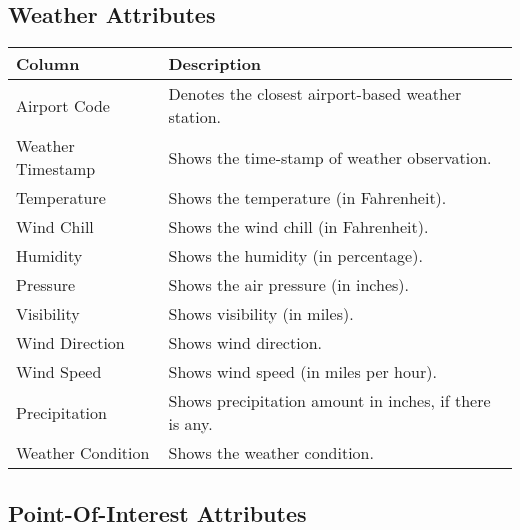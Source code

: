 \subsection{Weather Attributes}
\label{section:weather_attrs}

\begin{longtable}[c]{l | l}
    Column & Description \\
    \hline
    Airport Code & Denotes the closest airport-based weather station. \\
    Weather Timestamp & Shows the time-stamp of weather observation. \\
    Temperature & Shows the temperature (in Fahrenheit). \\
    Wind Chill & Shows the wind chill (in Fahrenheit). \\
    Humidity & Shows the humidity (in percentage). \\
    Pressure & Shows the air pressure (in inches). \\
    Visibility & Shows visibility (in miles). \\
    Wind Direction & Shows wind direction. \\
    Wind Speed & Shows wind speed (in miles per hour). \\
    Precipitation & Shows precipitation amount in inches, if there is any. \\
    Weather Condition & Shows the weather condition. \\
\end{longtable}

\subsection{Point-Of-Interest Attributes}
\label{section:poi_attrs}

